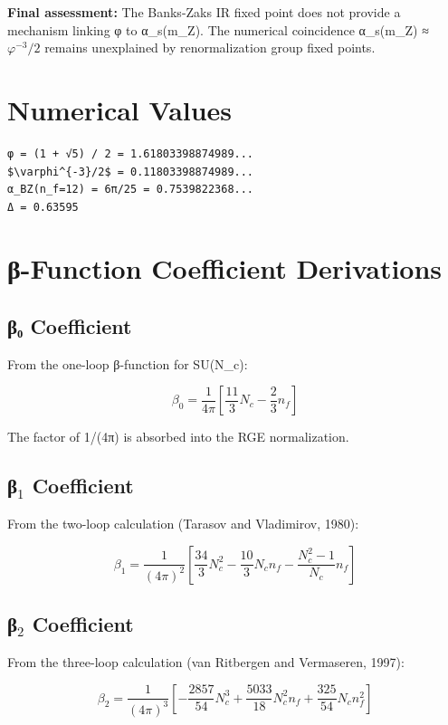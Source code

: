 \documentclass{article}
\begin{document}
\textbf{Final assessment:} The Banks-Zaks IR fixed point does not provide a mechanism linking φ to α_s(m_Z). The numerical coincidence α_s(m_Z) ≈ $\varphi^{-3}/2$ remains unexplained by renormalization group fixed points.

\appendix

\section{Numerical Values}

\begin{verbatim}
φ = (1 + √5) / 2 = 1.61803398874989...
$\varphi^{-3}/2$ = 0.11803398874989...
α_BZ(n_f=12) = 6π/25 = 0.7539822368...
Δ = 0.63595
\end{verbatim}

\section{β-Function Coefficient Derivations}

\subsection{β₀ Coefficient}

From the one-loop β-function for SU(N_c):

\[
\beta_0 = \frac{1}{4\pi}\left[\frac{11}{3}N_c - \frac{2}{3}n_f\right]
\]

The factor of 1/(4π) is absorbed into the RGE normalization.

\subsection{β$_1$ Coefficient}

From the two-loop calculation (Tarasov and Vladimirov, 1980):

\[
\beta_1 = \frac{1}{(4\pi)^2}\left[\frac{34}{3}N_c^2 - \frac{10}{3}N_c n_f - \frac{N_c^2 - 1}{N_c}n_f\right]
\]

\subsection{β$_2$ Coefficient}

From the three-loop calculation (van Ritbergen and Vermaseren, 1997):

\[
\beta_2 = \frac{1}{(4\pi)^3}\left[-\frac{2857}{54}N_c^3 + \frac{5033}{18}N_c^2 n_f + \frac{325}{54}N_c n_f^2\right]
\]
\end{document}
